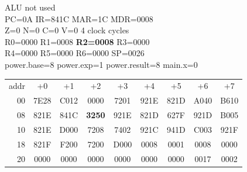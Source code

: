 \begin{tcolorbox}[stepbox, title={Step 25 \hfill PC 09 \quad LD R2, power.base}]
\textcolor{dim}{ALU} \textcolor{dim}{not used}\\
PC=0A IR=841C MAR=1C MDR=0008\\
Z=0 N=0 C=0 V=0 \hfill \textcolor{dim}{4 clock cycles}\\
R0=0000 R1=0008 \textcolor{wrt}{\textbf{R2=0008}} R3=0000\\
R4=0000 R5=0000 R6=0000 SP=0026\\
\textcolor{dim}{power.base=8  power.exp=1  power.result=8  main.x=0}\\[1pt]
{\setlength{\tabcolsep}{1.6pt}\begin{tabular}{@{}r*{8}{c}@{}}
\textcolor{dim}{addr} & \textcolor{dim}{+0} & \textcolor{dim}{+1} & \textcolor{dim}{+2} & \textcolor{dim}{+3} & \textcolor{dim}{+4} & \textcolor{dim}{+5} & \textcolor{dim}{+6} & \textcolor{dim}{+7}\\
\textcolor{dim}{00} & 7E28 & C012 & 0000 & 7201 & 921E & 821D & A040 & B610\\
\textcolor{dim}{08} & 821E & 841C & \cellcolor{pcc}\textbf{3250} & 921E & 821D & 627F & 921D & B005\\
\textcolor{dim}{10} & 821E & D000 & 7208 & 7402 & 921C & 941D & C003 & 921F\\
\textcolor{dim}{18} & 821F & F200 & 7200 & D000 & \cellcolor{datac}0008 & \cellcolor{datac}0001 & \cellcolor{datac}0008 & \cellcolor{datac}0000\\
\textcolor{dim}{20} & \cellcolor{stackc}0000 & \cellcolor{stackc}0000 & \cellcolor{stackc}0000 & \cellcolor{stackc}0000 & \cellcolor{stackc}0000 & \cellcolor{stackc}0000 & \cellcolor{stackc}0017 & \cellcolor{stackc}0002\\
\end{tabular}}
\end{tcolorbox}\par\vspace{3pt}
